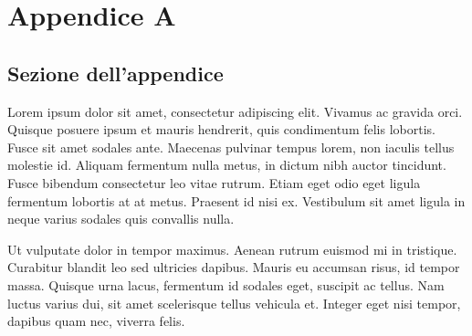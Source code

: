 \chapter{Appendice A}
\section{Sezione dell'appendice}
Lorem ipsum dolor sit amet, consectetur adipiscing elit. Vivamus ac gravida orci. Quisque posuere ipsum et mauris hendrerit, quis condimentum felis lobortis. Fusce sit amet sodales ante. Maecenas pulvinar tempus lorem, non iaculis tellus molestie id. Aliquam fermentum nulla metus, in dictum nibh auctor tincidunt. Fusce bibendum consectetur leo vitae rutrum. Etiam eget odio eget ligula fermentum lobortis at at metus. Praesent id nisi ex. Vestibulum sit amet ligula in neque varius sodales quis convallis nulla.

Ut vulputate dolor in tempor maximus. Aenean rutrum euismod mi in tristique. Curabitur blandit leo sed ultricies dapibus. Mauris eu accumsan risus, id tempor massa. Quisque urna lacus, fermentum id sodales eget, suscipit ac tellus. Nam luctus varius dui, sit amet scelerisque tellus vehicula et. Integer eget nisi tempor, dapibus quam nec, viverra felis.